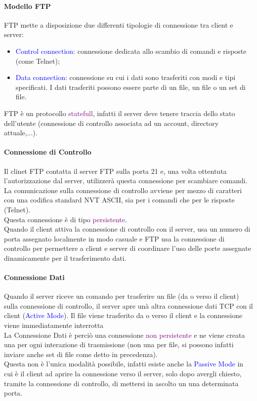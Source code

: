\paragraph{Modello FTP} FTP mette a disposizione due differenti tipologie di connessione tra client e server:
\begin{itemize}
    \item \textcolor{blue}{Control connection:} connessione dedicata allo scambio di comandi e risposte (come Telnet);
    \item \textcolor{blue}{Data connection:} connessione su cui i dati sono trasferiti con modi e tipi specificati. I dati trasferiti possono essere parte di un file, un file o un set di file.
\end{itemize}
FTP è un protocollo \textcolor{purple}{statefull}, infatti il server deve tenere traccia dello stato dell'utente (connessione di controllo associata ad un account, directory attuale,...).
\paragraph{Connessione di Controllo} Il clinet FTP contatta il server FTP sulla porta 21 e, una volta ottentuta l'autorizzazione dal server, utilizzerà questa connessione per scambiare comandi. 
La comunicazione sulla connessione di controllo avviene per mezzo di caratteri con una codifica standard NVT ASCII, sia per i comandi che per le risposte (Telnet).
\\Questa connessione è di tipo \textcolor{purple}{persistente}.
\\Quando il client attiva la connessione di controllo con il server, usa un numero di porta assegnato localmente in modo casuale e FTP usa la connessione di controllo per permettere a client e server di coordinare l’uso delle porte assegnate dinamicamente per il trasferimento dati.

\paragraph{Connessione Dati} 
Quando il server riceve un comando per trasferire un file (da o verso il client) sulla connessione di controllo, il server apre unà altra connessione dati TCP con il client (\textcolor{blue}{Active Mode}). Il file viene trasferito da o verso il client e la connessione viene immediatamente interrotta
\\La Connessione Dati è perciò una connessione \textcolor{purple}{non persistente} e ne viene creata una per ogni interazione di trasmissione (non una per file, si possono infatti inviare anche set di file come detto in precedenza).
\\Questa non è l'unica modalità possibile, infatti esiste anche la \textcolor{blue}{Passive Mode} in cui è il client ad aprire la connessione verso il server, solo dopo avergli chiesto, tramite la connessione di controllo, di mettersi in ascolto un una determinata porta.

